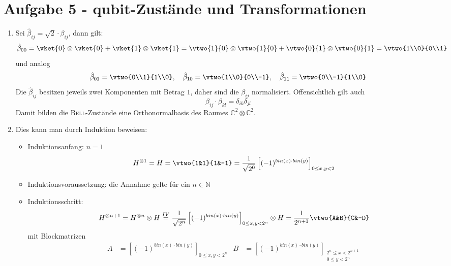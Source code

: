 \section*{Aufgabe 5 - qubit-Zustände und Transformationen}
\begin{enumerate}
\item Sei $\hat\beta_{ij} = \sqrt{2} \cdot \beta_{ij}$, dann gilt:
        \[ \hat\beta_{00} = \vket{0} \otimes \vket{0} + \vket{1} \otimes \vket{1} = \vtwo{1}{0} \otimes \vtwo{1}{0} + \vtwo{0}{1} \otimes \vtwo{0}{1} = \vtwo{1\\0}{0\\1} \]
        und analog
        \[ \hat\beta_{01} = \vtwo{0\\1}{1\\0}, \quad \hat\beta_{10} = \vtwo{1\\0}{0\\-1}, \quad \hat\beta_{11} = \vtwo{0\\-1}{1\\0} \]
        Die $\hat\beta_{ij}$ besitzen jeweils zwei Komponenten mit Betrag $1$, daher sind die $\beta_{ij}$ normalisiert. Offensichtlich gilt auch
        \[ \beta_{ij} \cdot \beta_{kl} = \delta_{ik} \delta_{jl} \]
        Damit bilden die \textsc{Bell}-Zustände eine Orthonormalbasis des Raumes $\mathds{C}^2 \otimes \mathds{C}^2$.
\item Dies kann man durch Induktion beweisen:
        \begin{itemize}
        \item Induktionsanfang: $n = 1$
                \[ H^{\otimes 1} = H = \vtwo{1&1}{1&-1} = \frac{1}{\sqrt{2^0}} \left[(-1)^{bin(x)\cdot bin(y)}\right]_{0\leq x,y < 2} \]
        \item Induktionsvoraussetzung: die Annahme gelte für ein $n \in \mathds{N}$
        \item Induktionsschritt:
                \[ H^{\otimes n+1} = H^{\otimes n} \otimes H \overset{IV}{=}
                   \frac{1}{\sqrt{2^n}} \left[(-1)^{bin(x)\cdot bin(y)}\right]_{0\leq x,y < 2^n}
                   \otimes H = \frac{1}{2^{n+1}} \vtwo{A&B}{C&-D} \]
                mit Blockmatrizen
                \begin{align*}
                A &= \left[(-1)^{bin(x)\cdot bin(y)}\right]_{0\leq x,y < 2^n} &
                B &= \left[(-1)^{bin(x)\cdot bin(y)}\right]_{\substack{2^n \leq  x < 2^{n+1} \\
                                                                              0  \leq y < 2^n}} \\

\end{align*}
\end{itemize}
\end{enumerate}
